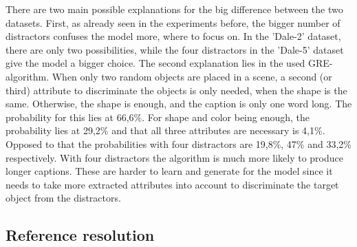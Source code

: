 There are two main possible explanations for the big difference between the two datasets.
First, as already seen in the experiments before, the bigger number of distractors confuses the model more, where to focus on.
In the 'Dale-2' dataset, there are only two possibilities, while the four distractors in the 'Dale-5' dataset give the model a bigger choice.
The second explanation lies in the used GRE-algorithm.
When only two random objects are placed in a scene, a second (or third) attribute to discriminate the objects is only needed, when the shape is the same.
Otherwise, the shape is enough, and the caption is only one word long.
The probability for this lies at 66,6\%.
For shape and color being enough, the probability lies at 29,2\% and that all three attributes are necessary is 4,1\%.
Opposed to that the probabilities with four distractors are 19,8\%, 47\% and 33,2\% respectively.
With four distractors the algorithm is much more likely to produce longer captions.
These are harder to learn and generate for the model since it needs to take more extracted attributes into account to discriminate the target object from the distractors.
\subsection{Reference resolution}
\label{sec:reference_resolution}
